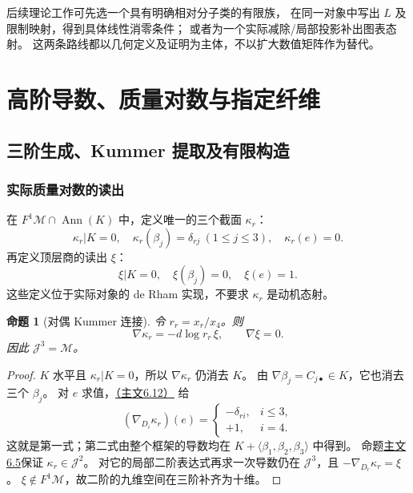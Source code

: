 \documentclass[11pt,a4paper,oneside]{ctexart}
\theoremstyle{cnplain}
\newtheorem{proposition}[theorem]{命题}
\theoremstyle{definition}
\theoremstyle{remark}
\newcommand{\Q}{\mathbb Q}
\newcommand{\C}{\mathbb C}
\newcommand{\Gr}{\operatorname{Gr}}
\newcommand{\Res}{\operatorname{Res}}
\newcommand{\dR}{\mathrm{dR}}
\numberwithin{equation}{section}
\newcommand{\otherref}[2]{\href{#1.pdf}{#2}}
\begin{document}
后续理论工作可先选一个具有明确相对分子类的有限族，
在同一对象中写出 $L$ 及限制映射，得到具体线性消零条件；
或者为一个实际减除/局部投影补出图表态射。
这两条路线都以几何定义及证明为主体，不以扩大数值矩阵作为替代。



\endgroup

\section{高阶导数、质量对数与指定纤维}\label{supp:deriv}

\begingroup
\providecommand{\Q}{\mathbb Q}
\providecommand{\C}{\mathbb C}
\providecommand{\dR}{\mathrm{dR}}
\providecommand{\Ann}{\operatorname{Ann}}
\providecommand{\Gr}{\operatorname{Gr}}
\providecommand{\Res}{\operatorname{Res}}
\providecommand{\rk}{\operatorname{rk}}
\providecommand{\cE}{\mathcal E}
\providecommand{\cM}{\mathcal M}
\subsection{三阶生成、Kummer 提取及有限构造}
\subsubsection{实际质量对数的读出}
在 $F^1\cM\cap\Ann(K)$ 中，定义唯一的三个截面 $\kappa_r$：
\begin{equation}\label{deriv:eq:kappa}
 \kappa_r|K=0,\quad \kappa_r(\beta_j)=\delta_{rj}\ (1\le j\le3),
 \quad \kappa_r(e)=0.
\end{equation}
再定义顶层商的读出 $\xi$：
\begin{equation}\label{deriv:eq:xi}
 \xi|K=0,\quad\xi(\beta_j)=0,\quad\xi(e)=1.
\end{equation}
这些定义位于实际对象的 de Rham 实现，不要求 $\kappa_r$ 是动机态射。

\begin{proposition}[对偶 Kummer 连接]\label{deriv:prop:kummer}
令 $r_r=x_r/x_4$。则
\begin{equation}\label{deriv:eq:kummerconnection}
 \nabla\kappa_r=-d\log r_r\,\xi,\qquad \nabla\xi=0.
\end{equation}
因此 $\mathcal J^3=\cM$。
\end{proposition}
\begin{proof}
$K$ 水平且 $\kappa_r|K=0$，所以 $\nabla\kappa_r$ 仍消去 $K$。
由 $\nabla\beta_j=C_{j\bullet}\in K$，它也消去三个 $\beta_j$。
对 $e$ 求值，\otherref{feynman_periods_long_paper}{（主文6.12）} 给
\[
 (\nabla_{D_i}\kappa_r)(e)=
 \begin{cases}-\delta_{ri},&i\le3,\\+1,&i=4.\end{cases}
\]
这就是第一式；第二式由整个框架的导数均在 $K+\langle\beta_1,\beta_2,\beta_3\rangle$ 中得到。
命题\otherref{feynman_periods_long_paper}{主文6.5}保证 $\kappa_r\in\mathcal J^2$。
对它的局部二阶表达式再求一次导数仍在 $\mathcal J^3$，且 $-\nabla_{D_r}\kappa_r=\xi$。
$\xi\notin F^1\cM$，故二阶的九维空间在三阶补齐为十维。
\end{proof}
\end{document}
